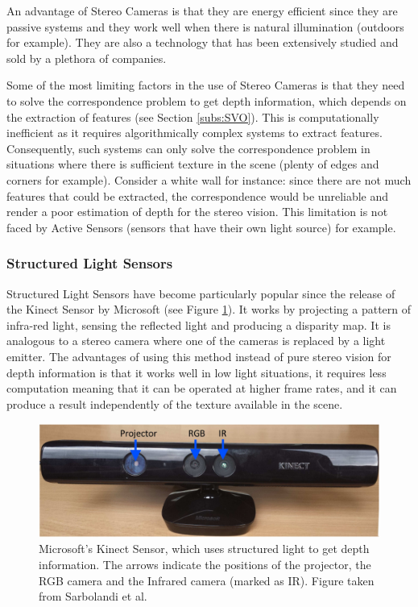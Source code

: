 \documentclass[11pt]{article}
\begin{document}
An advantage of Stereo Cameras is that they are energy efficient since they are passive systems and they work well when there is natural illumination (outdoors for example). They are also a technology that has been extensively studied and sold by a plethora of companies.

Some of the most limiting factors in the use of Stereo Cameras is that they need to solve the correspondence problem to get depth information, which depends on the extraction of features (see Section \ref{subs:SVO}). This is computationally inefficient as it requires algorithmically complex systems to extract features. Consequently, such systems can only solve the correspondence problem in situations where there is sufficient texture in the scene (plenty of edges and corners for example). Consider a white wall for instance: since there are not much features that could be extracted, the correspondence would be unreliable and render a poor estimation of depth for the stereo vision. This limitation is not faced by Active Sensors (sensors that have their own light source) for example.

	\subsubsection{Structured Light Sensors}

Structured Light Sensors have become particularly popular since the release of the Kinect Sensor by Microsoft \cite{kinectfusion}(see Figure \ref{fig:KinectSensor}). It works by projecting a pattern of infra-red light, sensing the reflected light and producing a disparity map. It is analogous to a stereo camera where one of the cameras is replaced by a light emitter. The advantages of using this method instead of pure stereo vision for depth information is that it works well in low light situations, it requires less computation meaning that it can be operated at higher frame rates, and it can produce a result independently of the texture available in the scene.

\begin{figure}
	\begin{minipage}{0.65\textwidth}
		\centering
		\includegraphics[width=\textwidth]{Kinectv1}
	\end{minipage} \hfill
	\begin{minipage}{0.35\textwidth}
		\centering
		\caption{Microsoft's Kinect Sensor, which uses structured light to get depth information. The arrows indicate the positions of the projector, the RGB camera and the Infrared camera (marked as IR). Figure taken from Sarbolandi et al. \cite{sarbolandi2015kinect}}
		\label{fig:KinectSensor}
	\end{minipage}				
\end{figure}
\end{document}
